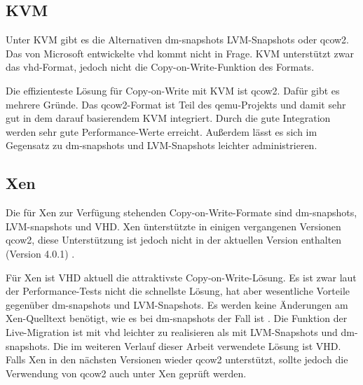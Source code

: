 \subsection{KVM}
Unter KVM gibt es die Alternativen dm-snapshots LVM-Snapshots oder qcow2. Das von Microsoft entwickelte vhd kommt nicht in Frage. KVM unterstützt zwar das vhd-Format, jedoch nicht die Copy-on-Write-Funktion des Formats. 

Die effizienteste Lösung für Copy-on-Write mit KVM ist qcow2. Dafür gibt es mehrere Gründe. Das qcow2-Format ist Teil des qemu-Projekts und damit sehr gut in dem darauf basierendem KVM integriert. Durch die gute Integration werden sehr gute Performance-Werte erreicht. Außerdem lässt es sich im Gegensatz zu dm-snapshots und LVM-Snapshots leichter administrieren.

\subsection{Xen}
Die für Xen zur Verfügung stehenden Copy-on-Write-Formate sind dm-snapshots, LVM-snapshots und VHD. Xen ünterstützte in einigen vergangenen Versionen qcow2, diese Unterstützung ist jedoch nicht in der aktuellen Version enthalten (Version 4.0.1)  \cite{qcow2support}. 

Für Xen ist VHD aktuell die attraktivste Copy-on-Write-Lösung. Es ist zwar laut der Performance-Tests nicht die schnellste Lösung, hat aber wesentliche Vorteile gegenüber dm-snapshots und LVM-Snapshots. Es werden keine Änderungen am Xen-Quelltext benötigt, wie es bei dm-snapshots der Fall ist \cite{racecondition}. Die Funktion der Live-Migration ist mit vhd leichter zu realisieren als mit LVM-Snapshots und dm-snapshots. Die im weiteren Verlauf dieser Arbeit verwendete Lösung ist VHD. Falls Xen in den nächsten Versionen wieder qcow2 unterstützt, sollte jedoch die Verwendung von qcow2 auch unter Xen geprüft werden. 